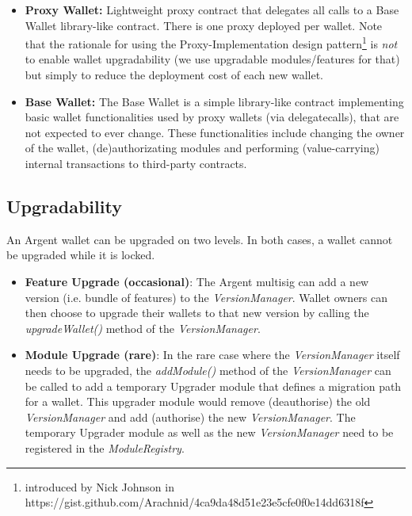 \documentclass[12pt]{article}
\begin{document}
\begin{itemize}
    \item \textbf{Proxy Wallet:} Lightweight proxy contract that delegates all calls to a Base Wallet library-like contract. There is one proxy deployed per wallet. Note that the rationale for using the Proxy-Implementation design pattern\footnote{ introduced by Nick Johnson in https://gist.github.com/Arachnid/4ca9da48d51e23e5cfe0f0e14dd6318f} is \emph{not} to enable wallet upgradability (we use upgradable modules/features for that) but simply to reduce the deployment cost of each new wallet.
    \item \textbf{Base Wallet:} The Base Wallet is a simple library-like contract implementing basic wallet functionalities used by proxy wallets (via delegatecalls), that are not expected to ever change. These functionalities include changing the owner of the wallet, (de)authorizating modules and performing (value-carrying) internal transactions to third-party contracts.
\end{itemize}


\subsection{Upgradability}
\label{sec:upgradability}
An Argent wallet can be upgraded on two levels. In both cases, a wallet cannot be upgraded while it is locked.
\begin{itemize}
    \item \textbf{Feature Upgrade (occasional)}:
The Argent multisig can add a new version (i.e. bundle of features) to the \emph{VersionManager}. Wallet owners can then choose to upgrade their wallets to that new version by calling the \emph{upgradeWallet()} method of the \emph{VersionManager}.
    \item \textbf{Module Upgrade (rare)}:
In the rare case where the \emph{VersionManager} itself needs to be upgraded, the \emph{addModule()} method of the \emph{VersionManager} can be called to add a temporary Upgrader module that defines a migration path for a wallet. This upgrader module would remove (deauthorise) the old \emph{VersionManager} and add (authorise) the new \emph{VersionManager}. The temporary Upgrader module as well as the new \emph{VersionManager} need to be registered in the \emph{ModuleRegistry}. 
\end{itemize}

\end{document}

